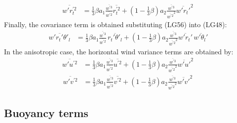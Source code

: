 \documentclass[11pt,fleqn]{article}
\begin{document}
%
\begin{equation}
\label{eq_wprtp2}
\begin{split}
\overline{w'r_t^{'2}}
& = 
    \frac{1}{3} \beta
    a_1 \frac{\overline{w^{'3}}}{\overline{w^{'2}}} \overline{r_t^{'2}}
  + \left( 1 - \frac{1}{3}\beta \right)
    a_2 \frac{\overline{w^{'3}}}{\overline{w^{'2}}^2} \overline{w'r_t'}^2 \,
\end{split}
\end{equation}
%
Finally, the covariance term is obtained substituting (LG56) into (LG48):
%
\begin{equation}
\label{eq_wprtpthlp}
\begin{split}
\overline{w'r_t'\theta'_l}
& =
    \frac{1}{3} \beta
    a_1 \frac{\overline{w^{'3}}}{\overline{w^{'2}}} \,
    \overline{r_t'\theta'_l}
  + \left( 1 - \frac{1}{3}\beta \right)
    a_2 \frac{\overline{w^{'3}}}{\overline{w^{'2}}^2}
    \overline{w'r_t'} \, \overline{w'\theta_l'}
\end{split}
\end{equation}
%
In the anisotropic case, the horizontal wind variance terms are obtained by:
%
\begin{equation}
\label{eq_wpup2}
\begin{split}
\overline{w'u^{'2}}
& = 
    \frac{1}{3} \beta
    a_1 \frac{\overline{w^{'3}}}{\overline{w^{'2}}} \overline{u^{'2}}
  + \left( 1 - \frac{1}{3}\beta \right)
    a_2 \frac{\overline{w^{'3}}}{\overline{w^{'2}}^2} \overline{w'u'}^2 \,
\end{split}
\end{equation}
%
\begin{equation}
\label{eq_wpvp2}
\begin{split}
\overline{w'v^{'2}}
& = 
    \frac{1}{3} \beta
    a_1 \frac{\overline{w^{'3}}}{\overline{w^{'2}}} \overline{v^{'2}}
  + \left( 1 - \frac{1}{3}\beta \right)
    a_2 \frac{\overline{w^{'3}}}{\overline{w^{'2}}^2} \overline{w'v'}^2 \,
\end{split}
\end{equation}
%

\subsection{Buoyancy terms}
\end{document}
